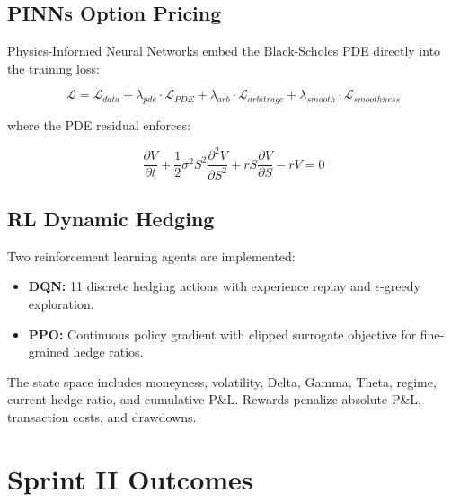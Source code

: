\documentclass[12pt,a4paper]{report}
\begin{document}
\subsection{PINNs Option Pricing}

Physics-Informed Neural Networks embed the Black-Scholes PDE directly into the training loss:

\begin{equation}
    \mathcal{L} = \mathcal{L}_{data} + \lambda_{pde} \cdot \mathcal{L}_{PDE} + \lambda_{arb} \cdot \mathcal{L}_{arbitrage} + \lambda_{smooth} \cdot \mathcal{L}_{smoothness}
\end{equation}

where the PDE residual enforces:

\begin{equation}
    \frac{\partial V}{\partial t} + \frac{1}{2}\sigma^2 S^2 \frac{\partial^2 V}{\partial S^2} + rS\frac{\partial V}{\partial S} - rV = 0
\end{equation}

\subsection{RL Dynamic Hedging}

Two reinforcement learning agents are implemented:

\begin{itemize}
    \item \textbf{DQN:} 11 discrete hedging actions with experience replay and $\epsilon$-greedy exploration.
    \item \textbf{PPO:} Continuous policy gradient with clipped surrogate objective for fine-grained hedge ratios.
\end{itemize}

The state space includes moneyness, volatility, Delta, Gamma, Theta, regime, current hedge ratio, and cumulative P\&L. Rewards penalize absolute P\&L, transaction costs, and drawdowns.

\section{Sprint II Outcomes}
\end{document}
